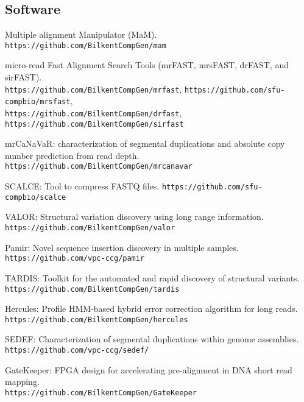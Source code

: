\subsection{\small \sc Software}
\begin{list2}
\item
  Multiple alignment Manipulator (MaM).
  {\tt https://github.com/BilkentCompGen/mam}
\item
  micro-read Fast Alignment Search Tools (mrFAST, mrsFAST, drFAST, and sirFAST).\\
  {\tt https://github.com/BilkentCompGen/mrfast},
  {\tt https://github.com/sfu-compbio/mrsfast},\\
  {\tt https://github.com/BilkentCompGen/drfast},
  {\tt https://github.com/BilkentCompGen/sirfast}
\item
  mrCaNaVaR: characterization of segmental duplications and absolute copy number prediction from read depth.
  {\tt https://github.com/BilkentCompGen/mrcanavar}
\item
  SCALCE: Tool to compress FASTQ files. 
  {\tt https://github.com/sfu-compbio/scalce}
\item
  VALOR: Structural variation discovery using long range information. \\
  {\tt https://github.com/BilkentCompGen/valor}
\item
  Pamir: Novel sequence insertion discovery in multiple samples.
  {\tt https://github.com/vpc-ccg/pamir}
\item
  TARDIS: Toolkit for the automated and rapid discovery of structural variants.\\
  {\tt https://github.com/BilkentCompGen/tardis}
\item
  Hercules: Profile HMM-based hybrid error correction algorithm for long reads.\\
  {\tt https://github.com/BilkentCompGen/hercules}
\item
  SEDEF: Characterization of segmental duplications within genome assemblies.\\
  {\tt https://github.com/vpc-ccg/sedef/}
\item
  GateKeeper: FPGA design for accelerating pre-alignment in DNA short read mapping.\\
  {\tt https://github.com/BilkentCompGen/GateKeeper}



\end{list2}

